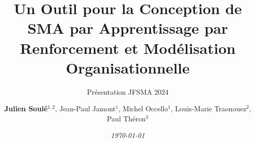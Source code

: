 \author{
    \textbf{Julien Soulé}$^{1,2}$, Jean-Paul Jamont$^{1}$, Michel Occello$^{1}$, Louis-Marie Traonouez$^{2}$, Paul Théron$^{3}$
}

\title{\textbf{Un Outil pour la Conception de SMA par Apprentissage par Renforcement et Modélisation Organisationnelle}}

\subtitle{Présentation JFSMA 2024}




\date{\textit{\footnotesize \today}}


